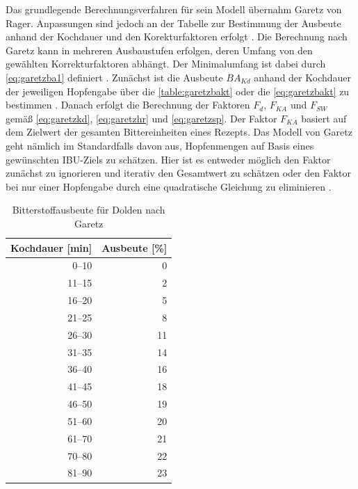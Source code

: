 \documentclass[a4paper,parskip=half]{scrartcl}
\newcommand{\BAKt}{{\mathit{BA}}_{\mathit{Kd}}}
\newcommand{\FKd}{F_{\mathit{d}}}
\newcommand{\FHR}{F_{\mathit{KA}}}
\newcommand{\FSP}{F_{\mathit{SW}}}
\begin{document}
Das grundlegende Berechnungsverfahren für sein Modell übernahm Garetz von Rager. Anpassungen sind jedoch an der Tabelle zur Bestimmung der Ausbeute anhand der Kochdauer und den Korekturfaktoren erfolgt \parencite[134-144]{Garetz1994}. Die Berechnung nach Garetz kann in mehreren Ausbaustufen erfolgen, deren Umfang von den gewählten Korrekturfaktoren abhängt. Der Minimalumfang ist dabei durch \autoref{eq:garetzba1} definiert \parencite[137]{Garetz1994}. Zunächst ist die Ausbeute $\BAKt$ anhand der Kochdauer der jeweiligen Hopfengabe über die \autoref{table:garetzbakt} oder die \autoref{eq:garetzbakt} zu bestimmen \parencite{Steinmeyer2021}. Danach erfolgt die Berechnung der Faktoren $\FKd$, $\FHR$ und $\FSP$ gemäß \autoref{eq:garetzkd}, \autoref{eq:garetzhr} und \autoref{eq:garetzsp}. Der Faktor $\FHR$ basiert auf dem Zielwert der gesamten Bittereinheiten eines Rezepts. Das Modell von Garetz geht nämlich im Standardfalls davon aus, Hopfenmengen auf Basis eines gewünschten IBU-Ziels zu schätzen. Hier ist es entweder möglich den Faktor zunächst zu ignorieren und iterativ den Gesamtwert zu schätzen oder den Faktor bei nur einer Hopfengabe durch eine quadratische Gleichung zu eliminieren \parencite[63]{Hall1997}.

\begin{table}[H]
\centering
\begin{tabular}{rr}
\toprule
\multicolumn{1}{c}{\textbf{Kochdauer [min]}} & \multicolumn{1}{c}{\textbf{Ausbeute [\%]}} \\
\midrule
0–10            & 0 \\
11–15           & 2 \\
16–20           & 5 \\
21–25           & 8 \\
26–30           & 11 \\
31–35           & 14 \\
36–40           & 16 \\
41–45           & 18 \\
46–50           & 19 \\
51–60           & 20 \\
61–70           & 21 \\
70–80           & 22 \\
81–90           & 23 \\
\bottomrule
\end{tabular}
\caption{Bitterstoffausbeute für Dolden nach Garetz \parencite[138]{Garetz1994}}
\label{table:garetzbakt}
\end{table}
\end{document}

